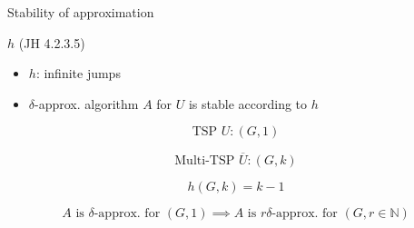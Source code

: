 \begin{frame}{Stability of approximation}
  \begin{exampleblock}{$h$ (JH 4.2.3.5)}
	\begin{itemize}
	  \item $h$: infinite jumps
	  \item $\delta$-approx. algorithm $A$ for $U$ is stable according to $h$
	\end{itemize}
  \end{exampleblock}

  \[
	\text{TSP } U:  (G, 1)
  \]

  \[
	\text{Multi-TSP } \overline{U}: (G, k)
  \]

  \[
	h(G,k) = k-1
  \]

  \[
	A \text{ is } \delta\text{-approx. for } (G, 1) \implies A \text{ is } r\delta\text{-approx. for } (G,r \in \mathbb{N})
  \]
\end{frame}
